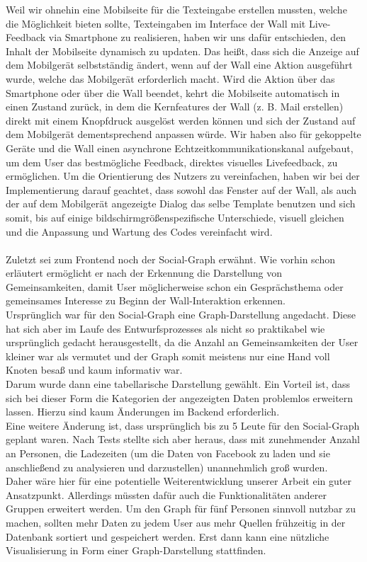 \documentclass[10pt,a4paper]{report}
\begin{document}
	Weil wir ohnehin eine Mobilseite für die Texteingabe erstellen mussten, welche die Möglichkeit bieten sollte, Texteingaben im Interface der Wall mit Live-Feedback via Smartphone zu realisieren, haben wir uns dafür entschieden, den Inhalt der Mobilseite dynamisch zu updaten. Das heißt, dass sich die Anzeige auf dem Mobilgerät selbstständig ändert, wenn auf der Wall eine Aktion ausgeführt wurde, welche das Mobilgerät erforderlich macht. Wird die Aktion über das Smartphone oder über die Wall beendet, kehrt die Mobilseite automatisch in einen Zustand zurück, in dem die Kernfeatures der Wall (z. B. Mail erstellen) direkt mit einem Knopfdruck ausgelöst werden können und sich der Zustand auf dem Mobilgerät dementsprechend anpassen würde. Wir haben also für gekoppelte Geräte und die Wall einen asynchrone Echtzeitkommunikationskanal aufgebaut, um dem User das bestmögliche Feedback, direktes visuelles Livefeedback, zu ermöglichen. Um die Orientierung des Nutzers zu vereinfachen, haben wir bei der Implementierung darauf geachtet, dass sowohl das Fenster auf der Wall, als auch der auf dem Mobilgerät angezeigte Dialog das selbe Template benutzen und sich somit, bis auf einige bildschirmgrößenspezifische Unterschiede, visuell gleichen und die Anpassung und Wartung des Codes vereinfacht wird.\\\\
	Zuletzt sei zum Frontend noch der Social-Graph erwähnt. Wie vorhin schon erläutert ermöglicht er nach der Erkennung die Darstellung von Gemeinsamkeiten, damit User möglicherweise schon ein Gesprächsthema oder gemeinsames Interesse zu Beginn der Wall-Interaktion erkennen.\\
	Ursprünglich war für den Social-Graph eine Graph-Darstellung angedacht. Diese hat sich aber im Laufe des Entwurfsprozesses als nicht so praktikabel wie ursprünglich gedacht herausgestellt, da die Anzahl an Gemeinsamkeiten der User kleiner war als vermutet und der Graph somit meistens nur eine Hand voll Knoten besaß und kaum informativ war.\\
	Darum wurde dann eine tabellarische Darstellung gewählt. Ein Vorteil ist, dass sich bei dieser Form die Kategorien der angezeigten Daten problemlos erweitern lassen. Hierzu sind kaum Änderungen im Backend erforderlich.\\ 
	Eine weitere Änderung ist, dass ursprünglich bis zu 5 Leute für den Social-Graph geplant waren. Nach Tests stellte sich aber heraus, dass mit zunehmender Anzahl an Personen, die Ladezeiten (um die Daten von Facebook zu laden und sie anschließend zu analysieren und darzustellen) unannehmlich groß wurden.\\
Daher wäre hier für eine potentielle Weiterentwicklung unserer Arbeit ein guter Ansatzpunkt. Allerdings müssten dafür auch die Funktionalitäten anderer Gruppen erweitert werden. Um den Graph für fünf Personen sinnvoll nutzbar zu machen, sollten mehr Daten zu jedem User aus mehr Quellen frühzeitig in der Datenbank sortiert und gespeichert werden. Erst dann kann eine nützliche Visualisierung in Form einer Graph-Darstellung stattfinden.
\end{document}
